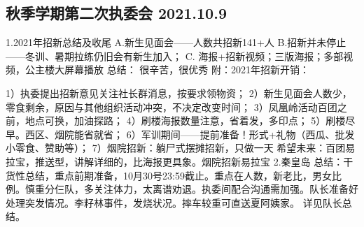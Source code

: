 \documentclass{ctexbook}
\begin{document}
\subsection{秋季学期第二次执委会 2021.10.9}
1.2021年招新总结及收尾 A.新生见面会——人数共招新141+人 B.招新并未停止——冬训、暑期拉练仍旧会有新生加入； C. 海报+招新视频；三版海报；多部视频，公主楼大屏幕播放 总结： 很辛苦，很优秀 附：2021年招新开销： 

1）执委提出招新意见关注社长群消息，按要求领物资；
2）新生见面会人数少，零食剩余，原因与其他组织活动冲突，不决定改变时间；
3）凤凰岭活动百团之前，地点可换，加油探路；
4）刷楼海报数量注意，省着发，多印点；
5）刷楼尽早。西区、烟院能省就省； 6）军训期间——提前准备！形式+礼物（西瓜、批发小零食、赞助等）；
7）烟院招新：躺尸式摆摊招新，只做一天
希望未来：百团易拉宝，推送型，讲解详细的，比海报更具象。烟院招新易拉宝 
2.秦皇岛 总结：干货性总结，重点前期准备，10月30号23:59截止。重点在人数，新老比，男女比例。慎重分仨队，多关注体力，太离谱劝退。执委间配合沟通需加强。队长准备好处理突发情况。李籽林事件，发烧状况。摔车较重可直送夏阿姨家。 详见队长总结。
\end{document}
